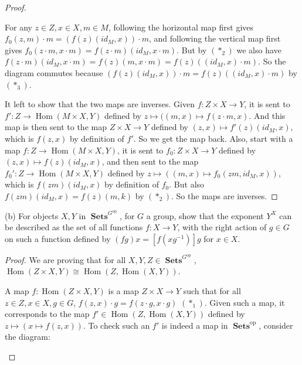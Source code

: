 \documentclass[a4paper]{article}
\DeclareMathOperator{\Sets}{\mathbf {Sets}}
\DeclareMathOperator{\op}{op}
\DeclareMathOperator{\Hom}{\text {Hom}}
\begin{document}
\begin{question}
\begin{proof}
        \begin{center}
        \end{center}
        For any $z\in Z,x\in X,m\in M$, following the horizontal map first gives $f_0(z,m)\cdot m=(f(z)(id_M,x))\cdot m$, and following the vertical map first gives $f_0(z\cdot m,x\cdot m)= f(z\cdot m)(id_M,x\cdot m)$. But by $(*_2)$ we also have $f(z\cdot m)(id_M,x\cdot m)=f(z)(m,x\cdot m) = f(z)((id_M,x)\cdot m)$. So the diagram commutes because $(f(z)(id_M,x))\cdot m = f(z)((id_M,x)\cdot m)$ by $(*_3)$.

        It left to show that the two maps are inverses. Given $f: Z\times X\to Y$, it is sent to $f':Z\to \Hom(M\times X,Y)$ defined by $z\mapsto ((m,x)\mapsto f(z\cdot m,x)$. And this map is then sent to the map $Z\times X\to Y$ defined by $(z,x)\mapsto f'(z)(id_M,x)$, which is $f(z,x)$ by definition of $f'$. So we get the map back. Also, start with a map $f: Z\to \Hom(M\times X,Y)$, it is sent to $f_0: Z\times X\to Y$ defined by $(z,x)\mapsto f(z)(id_M,x)$, and then sent to the map $f_0': Z\to \Hom(M\times X,Y)$ defined by $z\mapsto ((m,x)\mapsto f_0(zm,id_M,x))$, which is $f(zm)(id_M,x)$ by definition of $f_0$. But also $f(zm)(id_M,x)= f(z)(m,k)$ by $(*_2)$. So the maps are inverses.


    \end{proof}
    (b) For objects $X,Y$ in $\Sets^{G^{\op}}$, for $G$ a group, show that the exponent $Y^X$ can be described as the set of all functions $f: X\to Y$, with the right action of $g\in G$ on such a function defined by $(fg)x= [f(xg^{-1})]g$ for $x\in X$.\newline
    \begin{proof}
        We are proving that for all $X,Y, Z\in \Sets^{G^{\op}}$, $\Hom(Z\times X,Y)\cong \Hom(Z,\Hom(X,Y))$.

        A map $f:\Hom(Z\times X, Y)$ is a map $Z\times X\to Y$ such that for all $z\in Z,x\in X, g\in G$, $f(z,x)\cdot g = f(z\cdot g,x\cdot g)$ $(*_1)$. Given such a map, it corresponds to the map $f'\in \Hom(Z,\Hom(X,Y))$ defined by $z\mapsto (x\mapsto f(z,x))$. To check such an $f'$ is indeed a map in $\Sets^{\op}$, consider the diagram:
        \begin{center}
\end{center}
\end{proof}
\end{question}
\end{document}
